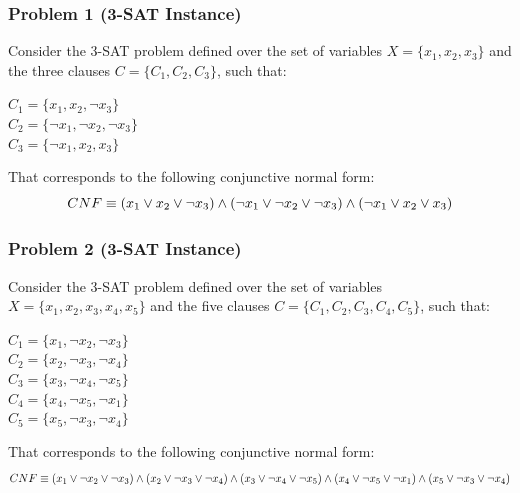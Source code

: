\documentclass[english]{article}
\begin{document}
			\subsubsection{Problem 1 (3-SAT Instance)}
			\label{sec:problem1}
				Consider the 3-SAT problem defined over the set of variables $X=\{x_1, x_2, x_3\}$ and the three clauses $C=\{C_1, C_2, C_3\}$, such that:
				\begin{center}
					$C_1 = \{x_1, x_2, \neg x_3\}$ \\
					$C_2 = \{\neg x_1, \neg x_2, \neg x_3\}$ \\
					$C_3 = \{\neg x_1, x_2, x_3\}$
				\end{center}
				That corresponds to the following conjunctive normal form:
				\begin{equation*}
					\centering
					CNF \equiv (x_1 \lor x_2 \lor \neg x_3) 
							\land (\neg x_1 \lor \neg x_2 \lor \neg x_3)
							\land (\neg x_1 \lor x_2 \lor x_3)
				\end{equation*}
				
			\subsubsection{Problem 2 (3-SAT Instance)}
			\label{sec:problem2}
			Consider the 3-SAT problem defined over the set of variables $X=\{x_1, x_2, x_3, x_4, x_5\}$ and the five clauses $C=\{C_1, C_2, C_3, C_4, C_5\}$, such that:
			\begin{center}
				$C_1 = \{x_1, \neg x_2, \neg x_3\}$ \\
				$C_2 = \{x_2, \neg x_3, \neg x_4\}$ \\
				$C_3 = \{x_3, \neg x_4, \neg x_5\}$ \\
				$C_4 = \{x_4, \neg x_5, \neg x_1\}$ \\
				$C_5 = \{x_5, \neg x_3, \neg x_4\}$
			\end{center}
			That corresponds to the following conjunctive normal form:
			\begin{equation*}
				\centering
				CNF \equiv (x_1 \lor \neg x_2 \lor \neg x_3)
						\land (x_2 \lor \neg x_3 \lor \neg x_4)
						\land (x_3 \lor \neg x_4 \lor \neg x_5)
						\land (x_4 \lor \neg x_5 \lor \neg x_1)
						\land (x_5 \lor \neg x_3 \lor \neg x_4)
			\end{equation*}
			
\end{document}
